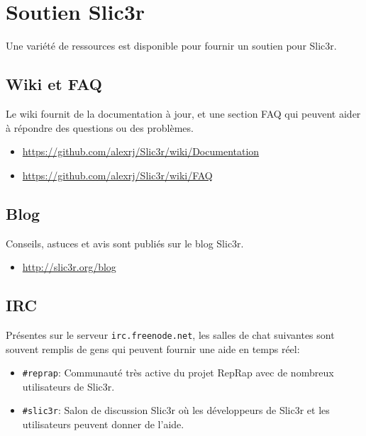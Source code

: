 \section{Soutien Slic3r} %
\label{sec:slic3r_support}


Une vari\'et\'e de ressources est disponible pour fournir un soutien pour Slic3r.
\subsection{Wiki et FAQ} %
\label{sub:wiki_and_faq}
Le wiki fournit de la documentation \`a jour, et une section FAQ qui peuvent aider \`a r\'epondre des questions ou des probl\`emes.
\begin{itemize}
    \item \url{https://github.com/alexrj/Slic3r/wiki/Documentation}
    \item \url{https://github.com/alexrj/Slic3r/wiki/FAQ}
\end{itemize}

\subsection{Blog} %
\label{sub:blog}
Conseils, astuces et avis sont publi\'es sur le blog Slic3r.
\begin{itemize}
    \item \url{http://slic3r.org/blog}
\end{itemize}

\subsection{IRC} %
\label{sub:irc}

Pr\'esentes sur le serveur \texttt{irc.freenode.net}, les salles de chat suivantes sont souvent remplis de gens qui peuvent fournir une aide en temps r\'eel:
\begin{itemize}
\item \texttt{\#reprap}: Communaut\'e tr\`es active du projet RepRap avec de nombreux utilisateurs de Slic3r.
\item \texttt{\#slic3r}: Salon de discussion Slic3r o\`u les d\'eveloppeurs de Slic3r et les utilisateurs peuvent donner de l'aide.
\end{itemize}

